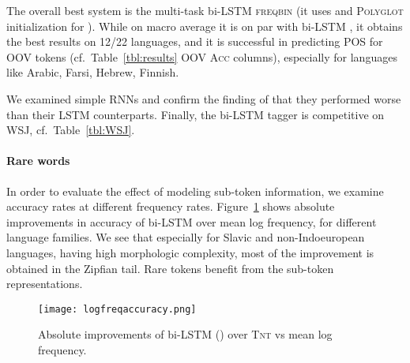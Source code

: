 \documentclass[11pt]{article}
\begin{document}
The overall best system is the multi-task bi-LSTM \textsc{freqbin} (it uses  and \textsc{Polyglot} initialization for ). 
While on macro average it is on par with bi-LSTM , it obtains the best results on 12/22 languages, and it is successful in predicting POS for OOV tokens 
(cf.\ Table~\ref{tbl:results} \textsc{OOV Acc} columns), especially for languages like Arabic, Farsi, Hebrew, Finnish. 

We examined simple RNNs and confirm the finding of   that they performed worse than their LSTM counterparts. 
Finally, the bi-LSTM tagger is competitive on WSJ, cf.\ Table~\ref{tbl:WSJ}. 

\paragraph{Rare words} In order to evaluate the effect of modeling sub-token information, we examine accuracy rates at different frequency rates. 
Figure~\ref{fig:logfreq} shows absolute improvements in accuracy of bi-LSTM  over mean log frequency, for different language families. We see that especially for Slavic and non-Indoeuropean languages, having high morphologic complexity, most of the improvement is obtained in the Zipfian tail. Rare tokens benefit from the sub-token representations.

\begin{figure}[h!]
\texttt{[image: logfreqaccuracy.png]}
\caption{Absolute improvements of bi-LSTM () over \textsc{Tnt} vs mean log frequency.}
\label{fig:logfreq}
\end{figure}
\end{document}
